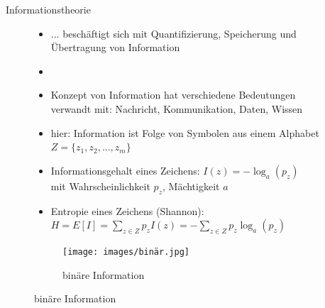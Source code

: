 \documentclass[aspectratio=1610, 9pt]{beamer}
\begin{document}
\begin{frame}{Informationstheorie}
  \begin{figure}
    \begin{minipage}{0.7\textwidth}
      \begin{itemize}
        \item[] ... beschäftigt sich mit Quantifizierung, Speicherung und Übertragung von Information
        \item[]
        \item Konzept von Information hat verschiedene Bedeutungen \\verwandt mit: Nachricht, Kommunikation, Daten, Wissen
        \item hier: Information ist Folge von Symbolen aus einem Alphabet $Z = \{z_1, z_2,...,z_m\}$
        \item Informationsgehalt eines Zeichens: $I(z) = -\log_a(p_z)$ \\mit Wahrscheinlichkeit $p_z$, Mächtigkeit $a$
        \item Entropie eines Zeichens (Shannon): $H = E[I] = \sum_{z \in Z}{p_z I(z)} = - \sum_{z \in Z}{ p_z \log_a(p_z)}$
      \end{itemize}
    \end{minipage}
    \hfill
    \begin{minipage}{0.28\textwidth}
      \begin{figure}
        \texttt{[image: images/binär.jpg]}
        \caption{binäre Information}
      \end{figure}
    \end{minipage}
  \end{figure}
\end{frame}
\end{document}
